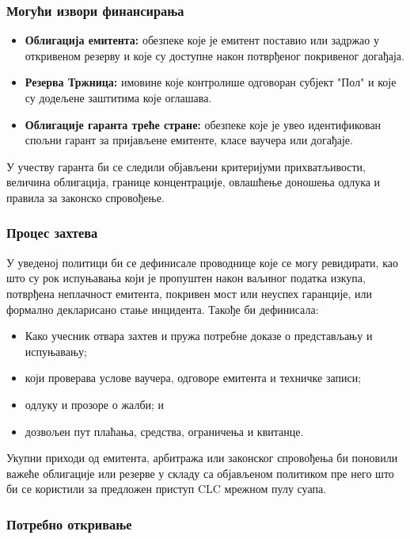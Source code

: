 \documentclass[11pt]{article}
\begin{document}
\subsubsection*{Могући извори финансирања}

\begin{itemize}[leftmargin=*]
\item \textbf{Облигација емитента:} обезпеке које је емитент поставио или задржао у откривеном резерву и које су доступне након потврђеног покривеног догађаја.
\item \textbf{Резерва Тржница:} имовине које контролише одговоран субјект "Пол" и које су додељене заштитима које оглашава.
\item \textbf{Облигације гаранта треће стране:} обезпеке које је увео идентификован спољни гарант за пријављене емитенте, класе ваучера или догађаје.
\end{itemize}
У учеству гаранта би се следили објављени критеријуми прихватљивости, величина облигација, границе концентрације, овлашћење доношења одлука и правила за законско спровођење.

\subsubsection*{Процес захтева}

У уведеној политици би се дефинисале проводнице које се могу ревидирати, као што су рок испуњавања који је пропуштен након ваљиног податка изкупа, потврђена неплачност емитента, покривен мост или неуспех гаранције, или формално декларисано стање инцидента. Такође би дефинисала:

\begin{itemize}[leftmargin=*]
\item Како учесник отвара захтев и пружа потребне доказе о представљању и испуњавању;
\item који проверава услове ваучера, одговоре емитента и техничке записи;
\item одлуку и прозоре о жалби; и
\item дозвољен пут плаћања, средства, ограничења и квитанце.
\end{itemize}
Укупни приходи од емитента, арбитража или законског спровођења би поновили важеће облигације или резерве у складу са објављеном политиком пре него што би се користили за предложен приступ CLC мрежном пулу суапа.

\subsubsection*{Потребно откривање}
\end{document}
